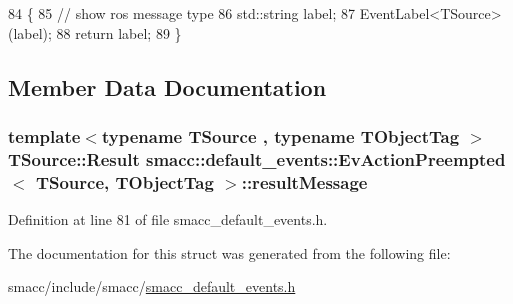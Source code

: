 \begin{DoxyCode}
84   \{
85     \textcolor{comment}{// show ros message type}
86     std::string label;
87     EventLabel<TSource>(label);
88     \textcolor{keywordflow}{return} label;
89   \}
\end{DoxyCode}


\subsection{Member Data Documentation}
\subsubsection[{\texorpdfstring{result\+Message}{resultMessage}}]{\setlength{\rightskip}{0pt plus 5cm}template$<$typename T\+Source , typename T\+Object\+Tag $>$ T\+Source\+::\+Result {\bf smacc\+::default\+\_\+events\+::\+Ev\+Action\+Preempted}$<$ T\+Source, T\+Object\+Tag $>$\+::result\+Message}\hypertarget{structsmacc_1_1default__events_1_1EvActionPreempted_a38f3c09c9c672b82b08ea5ff2085280e}{}\label{structsmacc_1_1default__events_1_1EvActionPreempted_a38f3c09c9c672b82b08ea5ff2085280e}


Definition at line 81 of file smacc\+\_\+default\+\_\+events.\+h.



The documentation for this struct was generated from the following file\+:\begin{DoxyCompactItemize}
\item 
smacc/include/smacc/\hyperlink{smacc__default__events_8h}{smacc\+\_\+default\+\_\+events.\+h}\end{DoxyCompactItemize}
